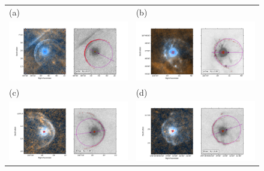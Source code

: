 \begin{figure}
  \centering
  \begin{tabular}{@{}ll@{}}
    (a) & (b) \\
    \includegraphics[trim=10 0 60 30, clip]{figs/alphaori-imageplot}
    & \includegraphics[trim=10 0 60 30, clip]{figs/mucep-imageplot}\\
    (c) & (d) \\
    \includegraphics[trim=10 0 60 30, clip]{figs/rhya-imageplot}
    & \includegraphics[trim=10 0 60 30, clip]{figs/rleo-imageplot}\\

\end{tabular}
\end{figure}
